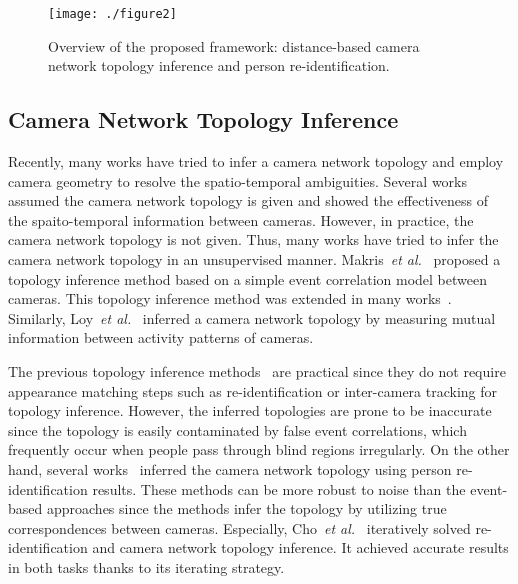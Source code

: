 \documentclass[10pt,twocolumn,letterpaper]{article}
\begin{document}
	
	\begin{figure*}[t]	
		\centering
		\texttt{[image: ./figure2]}
		\caption{Overview of the proposed framework: distance-based camera network topology inference and person re-identification.}
		\label{fig_2} \vspace{-5pt}
	\end{figure*}
	
	\subsection{Camera Network Topology Inference} 
	
	Recently, many works have tried to infer a camera network topology and employ camera geometry to resolve the spatio-temporal ambiguities. 	
	Several works~\cite{javed2003tracking,cai2014exploring,rahimi2004simultaneous} assumed the camera network topology is given and showed the effectiveness of the spaito-temporal information between cameras.
	However, in practice, the camera network topology is not given. Thus, many works have tried to infer the camera network topology in an unsupervised manner.
	Makris~\textit{et al.}~\cite{makris2004bridging} proposed a topology inference method based on a simple event correlation model between cameras. %
	This topology inference method was extended in many works~\cite{niu2006recovering,stauffer2005learning,chen2014object}.
	Similarly, Loy~\textit{et al.}~\cite{loy2010time,loy2012incremental} inferred a camera network topology by measuring mutual information between activity patterns of  cameras.
	
	The previous topology inference methods~\cite{makris2004bridging, stauffer2005learning,chen2014object, loy2010time,loy2012incremental} are practical since they do not require appearance matching steps such as re-identification or inter-camera tracking for topology inference.
	However, the inferred topologies are prone to be inaccurate since the topology is easily contaminated by false event correlations, which frequently occur when people pass through blind regions irregularly.
	On the other hand, several works~\cite{cai2010recovering,martinel2016person, Cho_2017_ICCV_Workshops} inferred the camera network topology using person re-identification results. These methods can be more robust to noise than the event-based approaches since the methods infer the topology by utilizing true correspondences between cameras.
	Especially, Cho~\textit{et al.}~\cite{Cho_2017_ICCV_Workshops} iteratively solved re-identification and camera network topology inference. It achieved accurate results in both tasks thanks to its iterating strategy.
	
\end{document}
